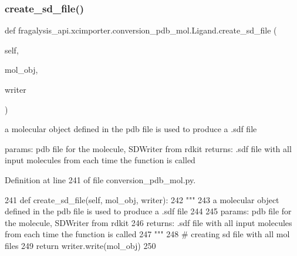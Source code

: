 \subsubsection{\texorpdfstring{create\+\_\+sd\+\_\+file()}{create\_sd\_file()}}
{\footnotesize\ttfamily def fragalysis\+\_\+api.\+xcimporter.\+conversion\+\_\+pdb\+\_\+mol.\+Ligand.\+create\+\_\+sd\+\_\+file (\begin{DoxyParamCaption}\item[{}]{self,  }\item[{}]{mol\+\_\+obj,  }\item[{}]{writer }\end{DoxyParamCaption})}

\begin{DoxyVerb}a molecular object defined in the pdb file is used to produce a .sdf file

params: pdb file for the molecule, SDWriter from rdkit
returns: .sdf file with all input molecules from each time the function is called
\end{DoxyVerb}
 

Definition at line 241 of file conversion\+\_\+pdb\+\_\+mol.\+py.


\begin{DoxyCode}
241     \textcolor{keyword}{def }create\_sd\_file(self, mol\_obj, writer):
242         \textcolor{stringliteral}{"""}
243 \textcolor{stringliteral}{        a molecular object defined in the pdb file is used to produce a .sdf file}
244 \textcolor{stringliteral}{}
245 \textcolor{stringliteral}{        params: pdb file for the molecule, SDWriter from rdkit}
246 \textcolor{stringliteral}{        returns: .sdf file with all input molecules from each time the function is called}
247 \textcolor{stringliteral}{        """}
248         \textcolor{comment}{# creating sd file with all mol files}
249         \textcolor{keywordflow}{return} writer.write(mol\_obj)
250 
\end{DoxyCode}
\mbox{\label{classfragalysis__api_1_1xcimporter_1_1conversion__pdb__mol_1_1_ligand_aa9601289368daa83655aa849041e7b63}} 
